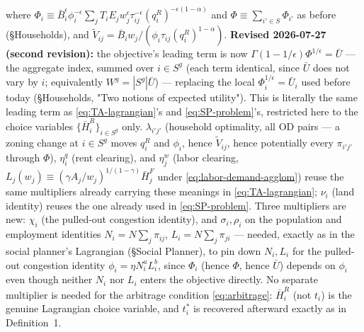 \documentclass[12pt, a4paper]{article}
\theoremstyle{definition}
\theoremstyle{remark}
\begin{document}
where $\Phi_i\equiv\bar B_i^\epsilon\phi_i^{-\epsilon}\sum_jT_iE_jw_j^\epsilon\tau_{ij}^{-\epsilon}(q_i^R)^{-\epsilon(1-\alpha)}$ and $\Phi\equiv\sum_{i'\in S}\Phi_{i'}$ as before (\S Households), and $\tilde V_{ij}=\bar B_iw_j/(\phi_i\tau_{ij}(q_i^R)^{1-\alpha})$. \textbf{Revised 2026-07-27 (second revision):} the objective's leading term is now $\Gamma(1-1/\epsilon)\Phi^{1/\epsilon}=\bar U$ — the aggregate index, summed over $i\in S^g$ (each term identical, since $\bar U$ does not vary by $i$; equivalently $W^g=|S^g|\bar U$) — replacing the local $\Phi_i^{1/\epsilon}=\bar U_i$ used before today (\S Households, "Two notions of expected utility"). This is literally the same leading term as \eqref{eq:TA-lagrangian}'s and \eqref{eq:SP-problem}'s, restricted here to the choice variables $\{\bar H_i^R\}_{i\in S^g}$ only. $\lambda_{i'j'}$ (household optimality, all OD pairs — a zoning change at $i\in S^g$ moves $q_i^R$ and $\phi_i$, hence $\tilde V_{ij}$, hence potentially every $\pi_{i'j'}$ through $\Phi$), $\eta_i^q$ (rent clearing), and $\eta_j^w$ (labor clearing, $L_j(w_j)\equiv(\gamma A_j/w_j)^{1/(1-\gamma)}\bar H_j^F$ under \eqref{eq:labor-demand-agglom}) reuse the same multipliers already carrying these meanings in \eqref{eq:TA-lagrangian}; $\nu_i$ (land identity) reuses the one already used in \eqref{eq:SP-problem}. Three multipliers are new: $\chi_i$ (the pulled-out congestion identity), and $\sigma_i,\rho_i$ on the population and employment identities $N_i=N\sum_j\pi_{ij}$, $L_i=N\sum_j\pi_{ji}$ — needed, exactly as in the social planner's Lagrangian (\S Social Planner), to pin down $N_i,L_i$ for the pulled-out congestion identity $\phi_i=\eta N_i^aL_i^b$, since $\Phi_i$ (hence $\Phi$, hence $\bar U$) depends on $\phi_i$ even though neither $N_i$ nor $L_i$ enters the objective directly. No separate multiplier is needed for the arbitrage condition \eqref{eq:arbitrage}: $\bar H_i^R$ (not $t_i$) is the genuine Lagrangian choice variable, and $t_i^*$ is recovered afterward exactly as in Definition~1.
\end{document}
